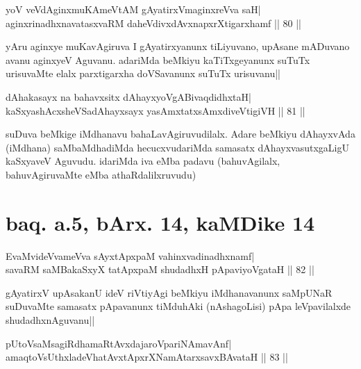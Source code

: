 
\begin{shl}
yoV veVdAginxmuKAmeVtAM gAyatirxVmaginxreVva saH| \\
aginxrinadhxnavatasxvaRM daheVdivxdAvxnapxrXtigarxhamf \hfill||  80 || 
\end{shl}

\begin{artha} 
yAru aginxye muKavAgiruva I gAyatirxyanunx tiLiyuvano, upAsane 
mADuvano avanu aginxyeV Aguvanu. adariMda beMkiyu kaTiTxgeyanunx 
suTuTx urisuvaMte elalx parxtigarxha doVSavanunx suTuTx urisuvanu||
\end{artha}


\begin{shl}
dAhakasayx na bahavxsitx dAhayxyoVgABivaqdidhxtaH| \\
kaSxyashAcxsheVSadAhayxsayx yasAmxtatxsAmxdiveVtigiVH \hfill||  81 || 
\end{shl}

\begin{artha} 
suDuva beMkige iMdhanavu bahaLavAgiruvudilalx. Adare beMkiyu 
dAhayxvAda (iMdhana) saMbaMdhadiMda hecucxvudariMda samasatx 
dAhayxvasutxgaLigU kaSxyaveV Aguvudu. idariMda iva eMba padavu 
(bahuvAgilalx, bahuvAgiruvaMte eMba athaRdalilxruvudu)
\end{artha}

\section*{baq. a.5, bArx. 14, kaMDike 14}

\begin{shl}
EvaMvideVvameVva sAyxtApxpaM vahinxvadinadhxnamf| \\
savaRM saMBakaSxyX tatApxpaM shudadhxH pApaviyoVgataH \hfill||  82 ||
\end{shl}

\begin{artha} 
gAyatirxV upAsakanU ideV riVtiyAgi beMkiyu iMdhanavanunx saMpUNaR 
suDuvaMte samasatx pApavanunx tiMduhAki (nAshagoLisi) pApa 
leVpavilalxde shudadhxnAguvanu||
\end{artha}


\begin{shl}
pUtoV\s saMsagiRdhamaRtAvxdajaroV\s pariNAmavAnf| \\
amaqtoV\s sUthxladeVhatAvxtApxrXNamAtarxsavxBAvataH \hfill||  83 || 
\end{shl}

